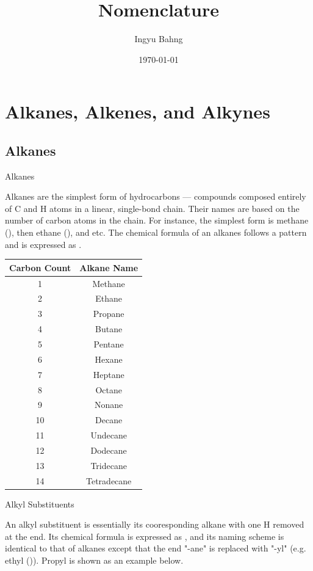 \documentclass[10pt]{article}
\title{Nomenclature}
\date{\today}
\author{Ingyu Bahng}
\begin{document}


\section{Alkanes, Alkenes, and Alkynes}

  \subsection{Alkanes}
    \label{sec:alkane}

    \begin{core}{Alkanes}

      Alkanes are the simplest form of hydrocarbons --- compounds composed entirely of C and H atoms in a linear, single-bond chain. Their names are based on the number of carbon atoms in the chain. For instance, the simplest form is methane (), then ethane (), and etc. The chemical formula of an alkanes follows a pattern and is expressed as .

      \begin{center}
        \begin{tabular}{cc}
          \hline
          Carbon Count & Alkane Name \\
          \hline
          1 & Methane \\
          2 & Ethane \\
          3 & Propane \\
          4 & Butane \\
          5 & Pentane \\
          6 & Hexane \\
          7 & Heptane \\
          8 & Octane \\
          9 & Nonane \\
          10 & Decane \\
          11 & Undecane \\
          12 & Dodecane \\
          13 & Tridecane \\
          14 & Tetradecane \\
          \hline
        \end{tabular}
      \end{center}

    \end{core}

    \begin{core}{Alkyl Substituents}

      An alkyl substituent is essentially its cooresponding alkane with one H removed at the end. Its chemical formula is expressed as , and its naming scheme is identical to that of alkanes except that the end "-ane" is replaced with "-yl" (e.g. ethyl ()). Propyl is shown as an example below.

      
    \end{core}
\end{document}
